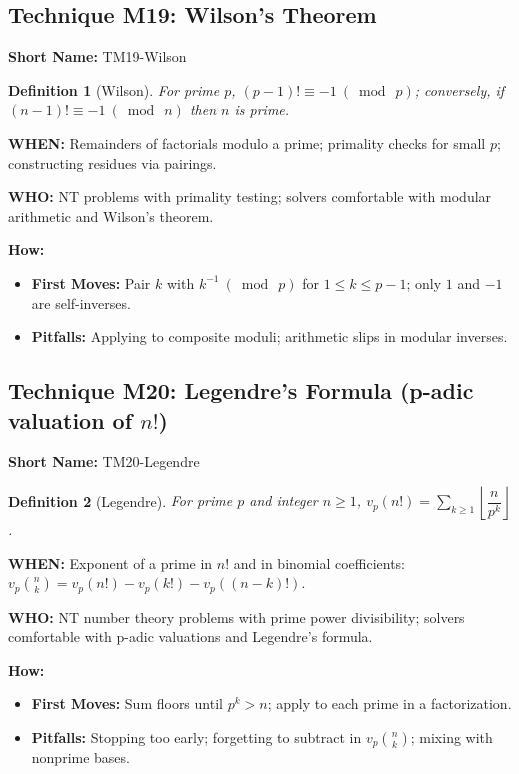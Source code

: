 \documentclass[12pt]{article}
\newtheorem{definition}{Definition}[section]
\begin{document}

\subsection{Technique M19: Wilson's Theorem}
\textbf{Short Name:} TM19-Wilson

\begin{definition}[Wilson]
For prime $p$, $(p-1)!\equiv -1\ (\bmod\ p)$; conversely, if $(n-1)!\equiv -1\ (\bmod\ n)$ then $n$ is prime.
\end{definition}

\textbf{WHEN:} Remainders of factorials modulo a prime; primality checks for small $p$; constructing residues via pairings.

\textbf{WHO:} NT problems with primality testing; solvers comfortable with modular arithmetic and Wilson's theorem.

\textbf{How:}
\begin{itemize}
    \item \textbf{First Moves:} Pair $k$ with $k^{-1}\ (\bmod\ p)$ for $1\le k\le p-1$; only $1$ and $-1$ are self-inverses.
    \item \textbf{Pitfalls:} Applying to composite moduli; arithmetic slips in modular inverses.
\end{itemize}

\subsection{Technique M20: Legendre's Formula (p-adic valuation of \texorpdfstring{$n!$}{n!})}
\textbf{Short Name:} TM20-Legendre

\begin{definition}[Legendre]
For prime $p$ and integer $n\ge 1$, $v_p(n!)=\sum_{k\ge 1} \left\lfloor \dfrac{n}{p^k} \right\rfloor$.
\end{definition}

\textbf{WHEN:} Exponent of a prime in $n!$ and in binomial coefficients: $v_p\!\binom{n}{k}=v_p(n!) - v_p(k!) - v_p((n-k)!)$.

\textbf{WHO:} NT number theory problems with prime power divisibility; solvers comfortable with p-adic valuations and Legendre's formula.

\textbf{How:}
\begin{itemize}
    \item \textbf{First Moves:} Sum floors until $p^k>n$; apply to each prime in a factorization.
    \item \textbf{Pitfalls:} Stopping too early; forgetting to subtract in $v_p\!\binom{n}{k}$; mixing with nonprime bases.
\end{itemize}
\end{document}
